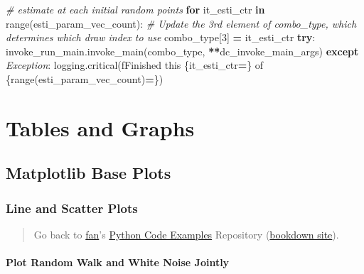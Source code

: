 \documentclass[
]{book}
\newenvironment{Shaded}{\begin{snugshade}}{\end{snugshade}}
\newcommand{\BuiltInTok}[1]{#1}
\newcommand{\CommentTok}[1]{\textcolor[rgb]{0.56,0.35,0.01}{\textit{#1}}}
\newcommand{\ControlFlowTok}[1]{\textcolor[rgb]{0.13,0.29,0.53}{\textbf{#1}}}
\newcommand{\DecValTok}[1]{\textcolor[rgb]{0.00,0.00,0.81}{#1}}
\newcommand{\KeywordTok}[1]{\textcolor[rgb]{0.13,0.29,0.53}{\textbf{#1}}}
\newcommand{\NormalTok}[1]{#1}
\newcommand{\OperatorTok}[1]{\textcolor[rgb]{0.81,0.36,0.00}{\textbf{#1}}}
\newcommand{\PreprocessorTok}[1]{\textcolor[rgb]{0.56,0.35,0.01}{\textit{#1}}}
\newcommand{\SpecialCharTok}[1]{\textcolor[rgb]{0.00,0.00,0.00}{#1}}
\newcommand{\SpecialStringTok}[1]{\textcolor[rgb]{0.31,0.60,0.02}{#1}}
\begin{document}
\begin{Shaded}
\begin{Highlighting}[]
\CommentTok{\# estimate at each initial random points}
\ControlFlowTok{for}\NormalTok{ it\_esti\_ctr }\KeywordTok{in} \BuiltInTok{range}\NormalTok{(esti\_param\_vec\_count):}
    \CommentTok{\# Update the 3rd element of combo\_type, which determines which draw index to use}
\NormalTok{    combo\_type[}\DecValTok{3}\NormalTok{] }\OperatorTok{=}\NormalTok{ it\_esti\_ctr}
    \ControlFlowTok{try}\NormalTok{:}
\NormalTok{        invoke\_run\_main.invoke\_main(combo\_type, }\OperatorTok{**}\NormalTok{dc\_invoke\_main\_args)}
    \ControlFlowTok{except} \PreprocessorTok{Exception}\NormalTok{:}
\NormalTok{        logging.critical(}\SpecialStringTok{f\textquotesingle{}Finished this }\SpecialCharTok{\{}\NormalTok{it\_esti\_ctr}\OperatorTok{=}\SpecialCharTok{\}}\SpecialStringTok{ of }\SpecialCharTok{\{}\BuiltInTok{range}\NormalTok{(esti\_param\_vec\_count)}\OperatorTok{=}\SpecialCharTok{\}}\SpecialStringTok{\textquotesingle{}}\NormalTok{)}
\end{Highlighting}
\end{Shaded}

\hypertarget{tables-and-graphs}{%
\chapter{Tables and Graphs}\label{tables-and-graphs}}

\hypertarget{matplotlib-base-plots}{%
\section{Matplotlib Base Plots}\label{matplotlib-base-plots}}

\hypertarget{line-and-scatter-plots}{%
\subsection{Line and Scatter Plots}\label{line-and-scatter-plots}}

\begin{quote}
Go back to \href{http://fanwangecon.github.io/}{fan}'s \href{https://fanwangecon.github.io/pyfan/}{Python Code Examples} Repository (\href{https://fanwangecon.github.io/pyfan/bookdown}{bookdown site}).
\end{quote}

\hypertarget{plot-random-walk-and-white-noise-jointly}{%
\subsubsection{Plot Random Walk and White Noise Jointly}\label{plot-random-walk-and-white-noise-jointly}}
\end{document}
